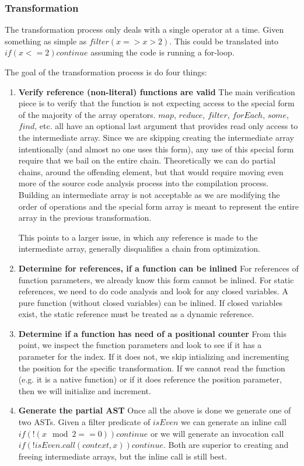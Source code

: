 \subsubsection{Transformation}

The transformation process only deals with a single operator at a time.  Given something as simple as $filter(x => x > 2)$.  This could be translated into $if (x <= 2) continue$ assuming the code is running a for-loop.

The goal of the transformation process is do four things:
\begin{enumerate}
  \item \textbf{Verify reference (non-literal) functions are valid}
    The main verification piece is to verify that the function is not expecting access to the special
    form of the majority of the array operators.  $map$, $reduce$, $filter$, $forEach$, $some$, $find$, etc.  all have an optional last argument that provides read only access to the intermediate array.  Since we are skipping creating the intermediate array intentionally (and almost no one uses this form), any use of this special form require that we bail on the entire chain. Theoretically we can do partial chains, around the offending element, but that would require moving even more of the source code analysis process into the compilation process.  Building an intermediate array is not acceptable  as we are modifying the order of operations and the special form array is meant to represent the entire array in the previous transformation.

    This points to a larger issue, in which any reference is made to the intermediate array, generally disqualifies a chain from optimization.

  \item \textbf{Determine for references, if a function can be inlined}
    For references of function parameters, we already know this form cannot be inlined.  For static references, we need to do code analysis and look for any closed variables.  A pure function (without closed variables) can be inlined.  If closed variables exist, the static reference must be treated as a dynamic reference.
  \item \textbf{Determine if a function has need of a positional counter}
    From this point, we inspect the function parameters and look to see if it has a parameter for the index.  If it does not, we skip intializing and incrementing the position for the specific transformation.  If we cannot read the function (e.g. it is a native function) or if it does reference the position parameter, then we will initialize and increment.
  \item \textbf{Generate the partial AST}
    Once all the above is done we generate one of two ASTs. Given a filter predicate of $isEven$ we can generate an inline call $if (!(x \mod 2 == 0)) continue$ or we will generate an invocation call $if (!isEven.call(context, x)) continue$.  Both are superior to creating and freeing intermediate arrays, but the inline call is still best.   
\end{enumerate}